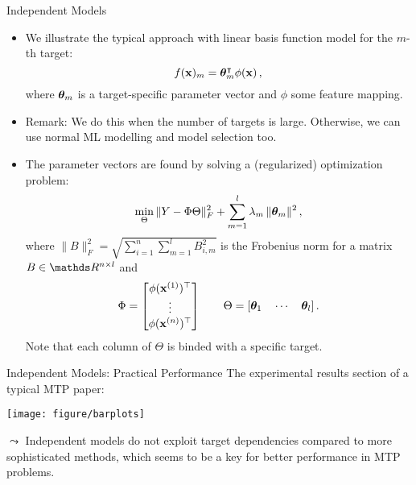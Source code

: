 \documentclass[11pt,compress,t,notes=noshow, xcolor=table]{beamer}
\begin{document}
\begin{frame}{Independent Models}
%	
	\footnotesize
%	
	\begin{itemize}
%		
		\item 	We illustrate the typical approach with linear basis function model for the $m$-th target: 
		\begin{equation*}
			f(\mathbf{x})_m = \bm{\theta}_m^\intercal \phi(\mathbf{x}) \,,
			\label{eq:binrel}
		\end{equation*}
%	
		where $\bm{\theta}_m$ is a target-specific parameter vector and $\phi$ some feature mapping.
        \item Remark: We do this when the number of targets is large. Otherwise, we can use normal ML modelling and model selection too.
%
		\item The parameter vectors are found by solving a (regularized) optimization problem: 
%		
		\begin{equation*}
			\label{eq:multiridge}
			\min_\Theta \|Y - \Phi \Theta \|^2_F +  \sum_{m=1}^l \lambda_m \,\|\bm{\theta}_m\|^2 \,,
		\end{equation*}
%	
		where $ \| B \|^2_F  = \sqrt{ \sum_{i=1}^n \sum_{m=1}^l B_{i,m}^2 } $ is the Frobenius norm for a matrix $B \in \R^{n \times l}$ and 
%		
		\begin{equation*}
			\label{eq:notation}
			\Phi = \begin{bmatrix} \phi(\mathbf{x}^{(1)})^\top \\ \vdots \\ \phi(\mathbf{x}^{(n)})^\top \end{bmatrix} \qquad \Theta = [\bm{\theta}_1 \quad \cdots \quad \bm{\theta}_l] \,.
		\end{equation*}
        Note that each column of $\Theta$ is binded with a specific target.
%
%	
	\end{itemize}
%
\end{frame}

\begin{frame}{Independent Models: Practical Performance}
%	
	The experimental results section of a typical MTP paper: 
%	
	\begin{center}
		\texttt{[image: figure/barplots]} \\
	\end{center}
%
	$\leadsto$ Independent models do not exploit target dependencies compared to more sophisticated methods, which seems to be a key for better performance in MTP problems.
%	
\end{frame}
\end{document}
